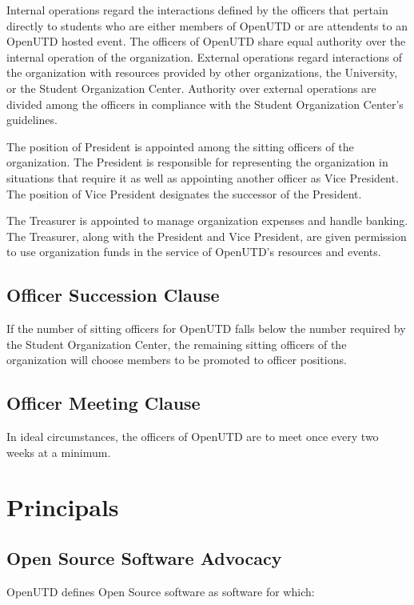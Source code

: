 \documentclass{constitution}
\begin{document}
Internal operations regard the interactions defined by the officers that pertain
directly to students who are either members of OpenUTD or are attendents to an
OpenUTD hosted event. The officers of OpenUTD share equal authority over the
internal operation of the organization. External operations regard interactions
of the organization with resources provided by other organizations, the
University, or the Student Organization Center. Authority over external
operations are divided among the officers in compliance with the Student
Organization Center's guidelines.

The position of President is appointed among the sitting officers of the
organization. The President is responsible for representing the organization in
situations that require it as well as appointing another officer as Vice
President. The position of Vice President designates the successor of the
President.

The Treasurer is appointed to manage organization expenses and handle banking.
The Treasurer, along with the President and Vice President, are given permission
to use organization funds in the service of OpenUTD's resources and events.

\subsection{Officer Succession Clause}

If the number of sitting officers for OpenUTD falls below the number required by
the Student Organization Center, the remaining sitting officers of the
organization will choose members to be promoted to officer positions.

\subsection{Officer Meeting Clause}

In ideal circumstances, the officers of OpenUTD are to meet once every two weeks
at a minimum.

\section{Principals}

\subsection{Open Source Software Advocacy}

OpenUTD defines Open Source software as software for which: 
\end{document}
